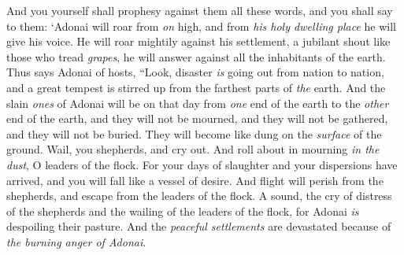 \begin{biblechapter}
\verse And you yourself shall prophesy against them all these words, and you shall say to them:
\verse ‘Adonai will roar from \textit{on} high, 
and from \textit{his holy dwelling place} he will give his voice. 
He will roar mightily against his settlement, 
a jubilant shout like those who tread \textit{grapes}, 
he will answer against all the inhabitants of the earth.
\verse Thus says Adonai of hosts,
\verse “Look, disaster \textit{is} going out from nation to nation, 
and a great tempest is stirred up from the farthest parts of \textit{the} earth.
\verse And the slain \textit{ones} of Adonai will be on that day 
from \textit{one} end of the earth to the \textit{other} end of the earth, 
and they will not be mourned, 
and they will not be gathered, 
and they will not be buried. 
They will become like dung on the \textit{surface} of the ground.
\verse Wail, you shepherds, and cry out. 
And roll about in mourning \textit{in the dust}, O leaders of the flock. 
For your days of slaughter and your dispersions have arrived, 
and you will fall like a vessel of desire.
\verse And flight will perish from the shepherds, 
and escape from the leaders of the flock.
\verse A sound, the cry of distress of the shepherds 
and the wailing of the leaders of the flock, 
for Adonai \textit{is} despoiling their pasture.
\verse And the \textit{peaceful settlements} are devastated 
because of \textit{the burning anger of Adonai}.
\end{biblechapter}

